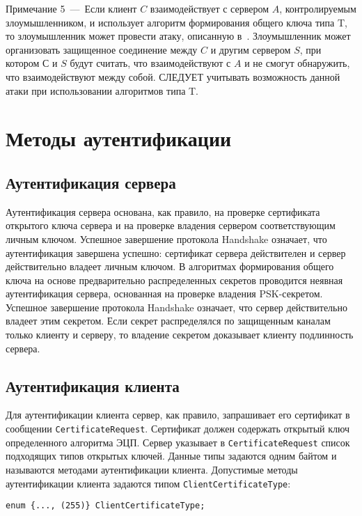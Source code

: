 \begin{note}
Примечание 5~---~Если клиент $C$ взаимодействует с сервером $A$, 
контролируемым злоумышленником, и использует алгоритм формирования общего 
ключа типа T, то злоумышленник может провести атаку, описанную 
в~\cite{TripleHandshake}. Злоумышленник может организовать защищенное 
соединение между $C$ и другим сервером $S$,  при котором $С$ и $S$ будут 
считать, что взаимодействуют с $A$ и не смогут обнаружить, что 
взаимодействуют между собой. СЛЕДУЕТ учитывать возможность данной атаки 
при использовании алгоритмов типа T.  
\end{note}

\section{Методы аутентификации}\label{CRYPTO.3}

\subsection{Аутентификация сервера}\label{CRYPTO.3.1}

Аутентификация сервера основана, как правило, на проверке сертификата 
открытого ключа сервера и на проверке владения сервером соответствующим 
личным ключом. Успешное завершение протокола Handshake означает, что 
аутентификация завершена успешно: сертификат сервера действителен и 
сервер действительно владеет личным ключом. 
В алгоритмах формирования общего ключа на основе предварительно 
распределенных секретов проводится неявная аутентификация сервера, 
основанная на проверке владения PSK-секретом. Успешное завершение 
протокола Handshake означает, что сервер действительно владеет этим 
секретом. Если секрет распределялся по защищенным каналам только клиенту 
и серверу, то владение секретом доказывает клиенту подлинность сервера. 

\subsection{Аутентификация клиента}\label{CRYPTO.3.2}

Для аутентификации клиента сервер, как правило, запрашивает его сертификат 
в сообщении \lstinline{CertificateRequest}. Сертификат должен содержать 
открытый ключ определенного алгоритма ЭЦП. Сервер указывает в 
\lstinline{CertificateRequest} список подходящих типов открытых ключей. 
Данные типы задаются одним байтом и  
называются методами аутентификации клиента. 
Допустимые методы аутентификации клиента задаются типом 
\lstinline{ClientCertificateType}:
\begin{lstlisting}
enum {..., (255)} ClientCertificateType;
\end{lstlisting}

